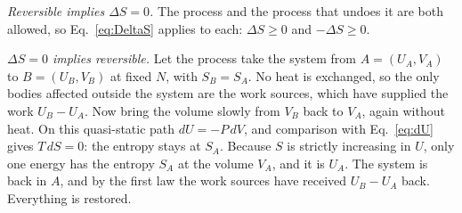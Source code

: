 \documentclass[10pt,a4paper]{article}
\theoremstyle{remark}
\begin{document}
\emph{Reversible implies $\Delta S=0$.} The process and the process that undoes
it are both allowed, so Eq.~\eqref{eq:DeltaS} applies to each: $\Delta S\geq0$
and $-\Delta S\geq0$.

\emph{$\Delta S=0$ implies reversible.} Let the process take the system from
$A=(U_A,V_A)$ to $B=(U_B,V_B)$ at fixed $N$, with $S_B=S_A$. No heat is
exchanged, so the only bodies affected outside the system are the work
sources, which have supplied the work $U_B-U_A$. Now bring the volume slowly
from $V_B$ back to $V_A$, again without heat. On this quasi-static path
$dU=-P\,dV$, and comparison with Eq.~\eqref{eq:dU} gives $T\,dS=0$: the entropy
stays at $S_A$. Because $S$ is strictly increasing in $U$, only one energy has
the entropy $S_A$ at the volume $V_A$, and it is $U_A$. The system is back in
$A$, and by the first law the work sources have received $U_B-U_A$ back.
Everything is restored.
\end{document}
